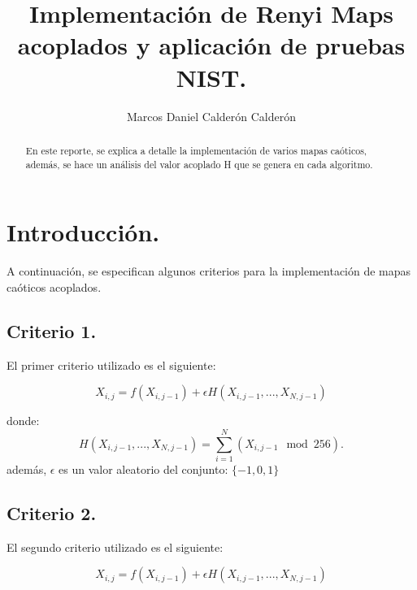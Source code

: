 \documentclass[12pt,3p]{elsarticle}
\begin{document}
\begin{frontmatter}

\title{Implementación de Renyi Maps acoplados y aplicación de pruebas NIST.}



\author{Marcos Daniel Calderón Calderón}







\begin{abstract}
En este reporte, se explica a detalle la implementación de varios mapas caóticos, además, se hace un análisis del valor acoplado H que se genera en cada algoritmo.
\end{abstract}



\end{frontmatter}

\section{Introducción.}

A continuación, se especifican algunos criterios para la implementación de mapas caóticos acoplados. 

\subsection{Criterio 1.}

El primer criterio utilizado es el siguiente:

\begin{equation}
X_{i,j}= f(X_{i,j-1})+ \epsilon  H(X_{i,j-1},...,X_{N,j-1})
\end{equation}

donde:
\begin{equation}
H(X_{i,j-1},...,X_{N,j-1}) = \sum_{i=1}^{N}(X_{i,j-1}\mod 256).
\end{equation}
además, $\epsilon$ es un valor aleatorio del conjunto: ${\{-1, 0, 1 \}}$




\subsection{Criterio 2.}

El segundo criterio utilizado es el siguiente:

\begin{equation}
X_{i,j}= f(X_{i,j-1})+ \epsilon  H(X_{i,j-1},...,X_{N,j-1})
\end{equation}
\end{document}

